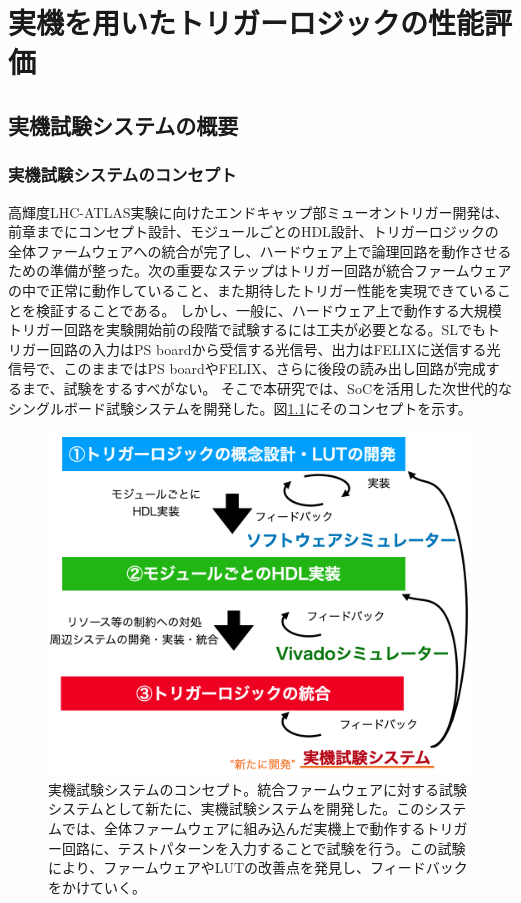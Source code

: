 \chapter{実機を用いたトリガーロジックの性能評価}
\label{chap_TriggerTest}

\section{実機試験システムの概要}
\subsection{実機試験システムのコンセプト}
高輝度LHC-ATLAS実験に向けたエンドキャップ部ミューオントリガー開発は、前章までにコンセプト設計、モジュールごとのHDL設計、トリガーロジックの全体ファームウェアへの統合が完了し、ハードウェア上で論理回路を動作させるための準備が整った。次の重要なステップはトリガー回路が統合ファームウェアの中で正常に動作していること、また期待したトリガー性能を実現できていることを検証することである。
しかし、一般に、ハードウェア上で動作する大規模トリガー回路を実験開始前の段階で試験するには工夫が必要となる。SLでもトリガー回路の入力はPS boardから受信する光信号、出力はFELIXに送信する光信号で、このままではPS boardやFELIX、さらに後段の読み出し回路が完成するまで、試験をするすべがない。
そこで本研究では、SoCを活用した次世代的なシングルボード試験システムを開発した。図\ref{Concept_test}にそのコンセプトを示す。

\begin{figure} 
\centering
\includegraphics[width=16cm]{fig/Test/Concept_test.png}
\caption[実機試験システムのコンセプト]{実機試験システムのコンセプト。統合ファームウェアに対する試験システムとして新たに、実機試験システムを開発した。このシステムでは、全体ファームウェアに組み込んだ実機上で動作するトリガー回路に、テストパターンを入力することで試験を行う。この試験により、ファームウェアやLUTの改善点を発見し、フィードバックをかけていく。}
\label{Concept_test}
\end{figure}

